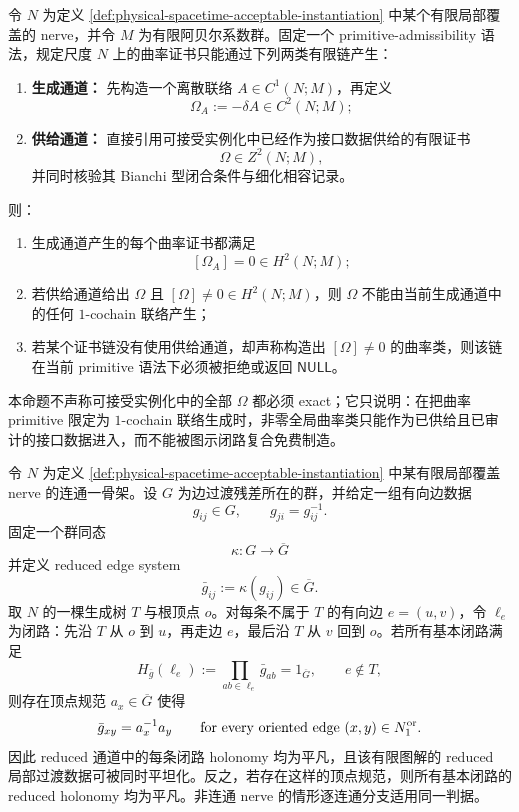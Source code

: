 \begin{proposition}[原始语法限定下的曲率证书二通道正规形]\label{distill:euclid_elements-finite_construction_certificate_families-curvature-certificate-two-channel-normal-form}
令 \(N\) 为定义 \ref{def:physical-spacetime-acceptable-instantiation} 中某个有限局部覆盖的 nerve，并令 \(M\) 为有限阿贝尔系数群。固定一个 primitive-admissibility 语法，规定尺度 \(N\) 上的曲率证书只能通过下列两类有限链产生：
\begin{enumerate}
  \item \textbf{生成通道：} 先构造一个离散联络 \(A\in C^1(N;M)\)，再定义
  \[
  \Omega_A:=-\delta A\in C^2(N;M);
  \]
  \item \textbf{供给通道：} 直接引用可接受实例化中已经作为接口数据供给的有限证书
  \[
  \Omega\in Z^2(N;M),
  \]
  并同时核验其 Bianchi 型闭合条件与细化相容记录。
\end{enumerate}
则：
\begin{enumerate}
  \item 生成通道产生的每个曲率证书都满足
  \[
  [\Omega_A]=0\in H^2(N;M);
  \]
  \item 若供给通道给出 \(\Omega\) 且 \([\Omega]\ne0\in H^2(N;M)\)，则 \(\Omega\) 不能由当前生成通道中的任何 \(1\)-cochain 联络产生；
  \item 若某个证书链没有使用供给通道，却声称构造出 \([\Omega]\ne0\) 的曲率类，则该链在当前 primitive 语法下必须被拒绝或返回 \(\mathsf{NULL}\)。
\end{enumerate}
本命题不声称可接受实例化中的全部 \(\Omega\) 都必须 exact；它只说明：在把曲率 primitive 限定为 \(1\)-cochain 联络生成时，非零全局曲率类只能作为已供给且已审计的接口数据进入，而不能被图示闭路复合免费制造。
\end{proposition}

\begin{proposition}
\label{distill:euclid_elements-diagrammatic_compatibility_audit_families-physical-reduced-holonomy-tree-gate}
令 \(N\) 为定义 \ref{def:physical-spacetime-acceptable-instantiation} 中某有限局部覆盖 nerve 的连通一骨架。设 \(G\) 为边过渡残差所在的群，并给定一组有向边数据
\[
g_{ij}\in G,\qquad g_{ji}=g_{ij}^{-1}.
\]
固定一个群同态
\[
\kappa:G\longrightarrow \overline G
\]
并定义 reduced edge system
\[
\bar g_{ij}:=\kappa(g_{ij})\in\overline G.
\]
取 \(N\) 的一棵生成树 \(T\) 与根顶点 \(o\)。对每条不属于 \(T\) 的有向边 \(e=(u,v)\)，令 \(\ell_e\) 为闭路：先沿 \(T\) 从 \(o\) 到 \(u\)，再走边 \(e\)，最后沿 \(T\) 从 \(v\) 回到 \(o\)。若所有基本闭路满足
\[
H_{\bar g}(\ell_e):=\prod_{ab\in\ell_e}\bar g_{ab}=1_{\overline G},
\qquad e\notin T,
\]
则存在顶点规范 \(a_x\in\overline G\) 使得
\[
\bar g_{xy}=a_x^{-1}a_y
\qquad\text{for every oriented edge }(x,y)\in N_1^{\rm or}.
\]
因此 reduced 通道中的每条闭路 holonomy 均为平凡，且该有限图解的 reduced 局部过渡数据可被同时平坦化。反之，若存在这样的顶点规范，则所有基本闭路的 reduced holonomy 均为平凡。非连通 nerve 的情形逐连通分支适用同一判据。
\end{proposition}

